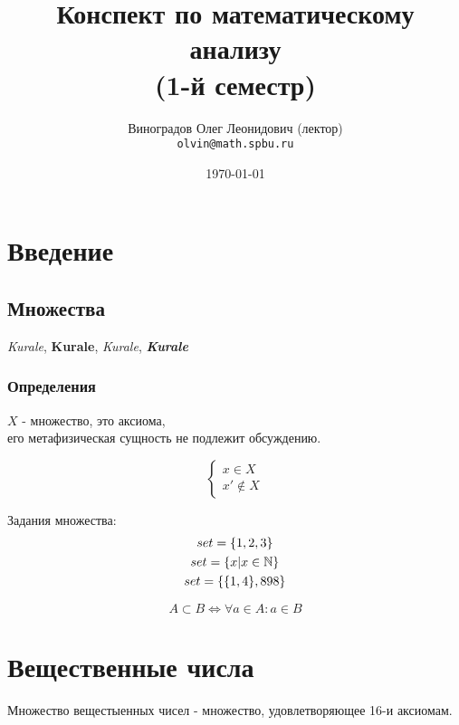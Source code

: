 \documentclass[12pt, a4paper]{article}
\title{Конспект по математическому анализу \\(1-й семестр)}
\author{
  \vova
  \and
  Виноградов Олег Леонидович (лектор)\\
  \texttt{olvin@math.spbu.ru}
}
\date{\today}
\begin{document}
  \maketitle
  \newpage
  \tableofcontents
  \newpage


  \section{Введение}

  \subsection{Множества}

  \textit{Kurale}, 
  \textbf{Kurale},
  \textsl{Kurale},
  \textit{\textbf{Kurale}}


  \subsubsection{Определения} 

  \begin{definition}[Множество]
  $X$ - множество, это аксиома, \\
  его метафизическая сущность не подлежит обсуждению.  
  \end{definition}

  \begin{equation}
  \begin{cases}
    x \in X \\
    x' \notin X
  \end{cases}
  \end{equation}

  \begin{example}
  Задания множества: 
  \begin{gather}
    set = \{1, 2, 3\} \\
    set = \{x | x \in {\mathbb{N}}\} \\
    set = \{\{1, 4\}, 898\}
  \end{gather}
  \end{example}

  \begin{definition}[Подмножество]
  \begin{equation}
    A \subset B \Longleftrightarrow \forall a \in A: a \in B
  \end{equation}
  \end{definition}

  \section{Вещественные числа}
  Множество вещестыенных чисел - множество, 
  удовлетворяющее 16-и аксиомам.
\end{document}
